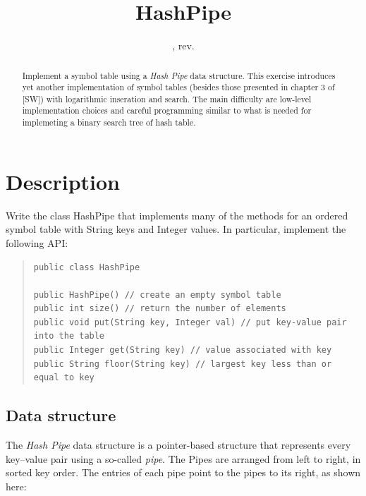 \documentclass{tufte-handout}
\title{HashPipe}
\author{}
\date{\GITAuthorDate, rev. \GITAbrHash}
\begin{document}
\maketitle

\begin{abstract}
  Implement a symbol table using a \emph{Hash Pipe} data structure.
  This exercise introduces yet another implementation of symbol tables (besides those presented in chapter 3 of [SW]) with logarithmic inseration and search.
  The main difficulty are low-level implementation choices and careful programming  similar to what is needed for implemeting a binary search tree of hash table.
\end{abstract}

\section{Description}

Write the class HashPipe that implements many of the methods for an ordered symbol table with String keys and Integer values. 
In particular, implement the following API:

\begin{quotation}
\begin{fullwidth}\small
\begin{verbatim}
public class HashPipe 

public HashPipe() // create an empty symbol table
public int size() // return the number of elements
public void put(String key, Integer val) // put key-value pair into the table
public Integer get(String key) // value associated with key
public String floor(String key) // largest key less than or equal to key 
 \end{verbatim}
\end{fullwidth}
\end{quotation}

\subsection{Data structure}

The \emph{Hash Pipe} data structure is a pointer-based structure that represents every key--value pair using a so-called \emph{pipe}.
The Pipes are arranged from left to right, in sorted key order.
The entries of each pipe point to the pipes to its right, as shown here:
\end{document}
